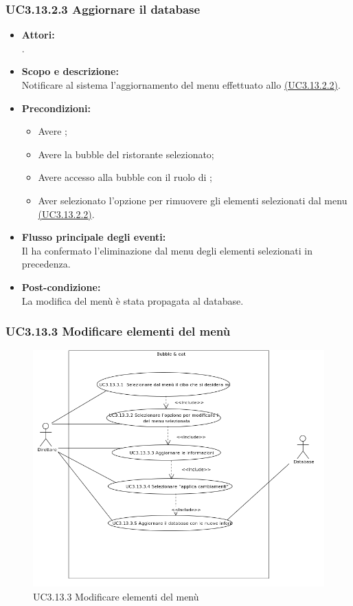 \subsubsection{UC3.13.2.3 Aggiornare il database} \label{UC3.13.2.3}

\begin{itemize}
	\item \textbf{Attori:}
	\\.
	\item \textbf{Scopo e descrizione:} 
	\\Notificare al sistema l'aggiornamento del menu effettuato allo \hyperref[UC3.13.2.2]{(UC3.13.2.2)}.
	\item \textbf{Precondizioni:}
	\begin{itemize}
		\item Avere ;
		\item Avere la bubble del ristorante selezionato;
		\item Avere accesso alla bubble con il ruolo di ;
		\item Aver selezionato l’opzione per rimuovere gli elementi selezionati dal menu \hyperref[UC3.13.2.2]{(UC3.13.2.2)}.
	\end{itemize}
	\item \textbf{Flusso principale degli eventi:}
	\\Il {} ha confermato l’eliminazione dal menu degli elementi selezionati in precedenza.
	\item \textbf{Post-condizione:}
	\\La modifica del menù è stata propagata al database.
\end{itemize}

\subsubsection{UC3.13.3 Modificare elementi del menù} \label{UC3.13.3}

\begin{figure}[H]
	\centering
	\includegraphics[width=15cm]{../../documenti/AnalisiDeiRequisiti/Diagrammi_img/uc3_13_3.png}
	\caption{UC3.13.3 Modificare elementi del menù}
\end{figure}

